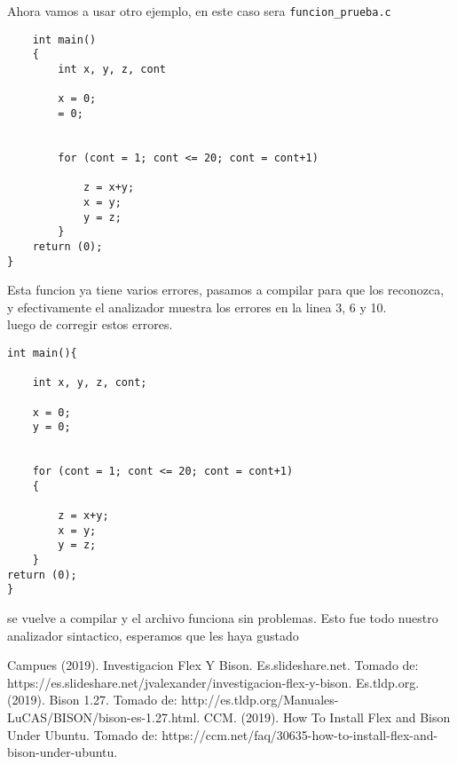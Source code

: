 \documentclass[spanish]{article}
\begin{document}
Ahora vamos a usar otro ejemplo, en este caso sera \texttt{funcion\_prueba.c}\\
\begin{lstlisting}
	int main()
	{
		int x, y, z, cont
		
		x = 0;
		= 0;
		
		
		for (cont = 1; cont <= 20; cont = cont+1)
		
			z = x+y;
			x = y;
			y = z;
		}
	return (0);
}
\end{lstlisting}
Esta funcion ya tiene varios errores, pasamos a compilar para que los reconozca, y efectivamente el analizador muestra los errores en la linea 3, 6 y 10.\\ luego de corregir estos errores.\\
\begin{lstlisting}
int main(){

	int x, y, z, cont;

	x = 0;
	y = 0;


	for (cont = 1; cont <= 20; cont = cont+1)
	{

		z = x+y;
		x = y;
		y = z;
	}
return (0);
}
\end{lstlisting}
se vuelve a compilar y el  archivo funciona sin problemas. Esto fue todo nuestro analizador sintactico, esperamos que les haya gustado

\renewcommand{\refname}{ \begin{center}\normalsize \textbf{Referencias} \end{center}}
\begin{thebibliography}{0}

   Campues (2019). Investigacion Flex Y Bison. Es.slideshare.net. Tomado de: https:\///es.slideshare.net\//jvalexander\//investigacion-flex-y-bison.
   Es.tldp.org. (2019). Bison 1.27. Tomado de: http:\///es.tldp.org\//Manuales-LuCAS\//BISON\//bison-es-1.27.html.
   CCM. (2019). How To Install Flex and Bison Under Ubuntu. Tomado de: https:\///ccm.net\//faq\//30635-how-to-install-flex-and-bison-under-ubuntu.
  
\end{thebibliography}	
\end{document}
